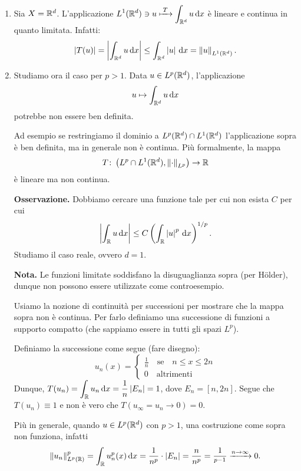 \documentclass[a4paper, 12pt]{report}
\begin{document}
\begin{enumerate}
\item Sia $X = \mathbb R^d$. L'applicazione $\displaystyle L^1(\mathbb R^d) \ni u \xmapsto{\; T \;} \int_{\mathbb R^d} u \,\mathrm{d} x$ è lineare e continua in quanto limitata. Infatti:
%
$$
\left| T(u) \right| = \left| \int_{\mathbb R^d} u \,\mathrm{d} x  \right| \leq \int_{\mathbb R^d} \left| u \right| \,\mathrm{d} x = \left\lVert u \right\rVert_{L^1(\mathbb R^d)}.
$$
%

\item Studiamo ora il caso per $p > 1$. Data $u \in L^p(\mathbb R^d)$, l'applicazione
%
$$
u \mapsto \int_{\mathbb R^d} u \,\mathrm{d} x 
$$
%
potrebbe non essere ben definita.

Ad esempio se restringiamo il dominio a $L^p(\mathbb R^d) \cap L^1(\mathbb R^d)$ l'applicazione sopra è ben definita, ma in generale non è continua.
Più formalmente, la mappa
%
$$
T \colon \left( L^p \cap L^1(\mathbb R^d), \left\lVert \cdot \right\rVert_{L^p} \right) \to \mathbb R
$$
%
è lineare ma non continua.

\textbf{Osservazione.} Dobbiamo cercare una funzione tale per cui non esista $C$ per cui
%
$$
\left| \int_{\mathbb R} u \,\mathrm{d} x  \right| \leq C \left( \int_{\mathbb R} \left| u \right|^p \,\mathrm{d} x  \right)^{1/p}.
$$
%
Studiamo il caso reale, ovvero $d = 1$.

\textbf{Nota.} Le funzioni limitate soddisfano la disuguaglianza sopra (per Hölder), dunque non possono essere utilizzate come controesempio. 

Usiamo la nozione di continuità per successioni per mostrare che la mappa sopra non è continua. Per farlo definiamo una successione di funzioni a supporto compatto (che sappiamo essere in tutti gli spazi $L^p$).

Definiamo la successione come segue (fare disegno):
%
$$
u_n (x) =
\begin{cases}
\frac{1}{n} \quad \text{se} \quad n \leq x \leq 2n \\
0 \quad \text{altrimenti} 
\end{cases} 
$$
%
Dunque, $\displaystyle T(u_n) = \int_{\mathbb R} u_n \,\mathrm{d} x = \frac{1}{n} \left| E_n \right| = 1$, dove $E_n = [n,2n]$.
Segue che $T(u_n) \equiv 1$ e non è vero che $T(u_\infty = u_n \to 0) = 0$.

Più in generale, quando $u \in L^p(\mathbb R^d)$ con $p > 1$, una costruzione come sopra non funziona, infatti
%
$$
\left\lVert u_n \right\rVert_{L^p(\mathbb R)}^p = \int_{\mathbb R} u_n^p(x) \,\mathrm{d} x = \frac{1}{n^p} \cdot \left| E_n \right| = \frac{n}{n^p} = \frac{1}{^{p-1}} \xrightarrow{n \to \infty} 0.
$$
%

\end{enumerate}
\end{document}
